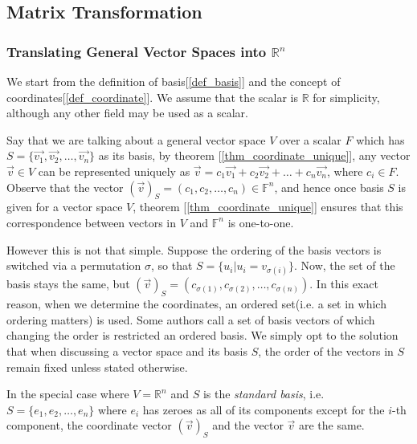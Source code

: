 \documentclass{report}
\begin{document}
	\subsection{Matrix Transformation}
	\subsubsection{Translating General Vector Spaces into $\mathbb{R}^n$}
	We start from the definition of basis[\ref{def_basis}] and the concept of coordinates[\ref{def_coordinate}]. We assume that the scalar is $\mathbb{R}$ for simplicity, although any other field may be used as a scalar.
	
	Say that we are talking about a general vector space $V$ over a scalar $F$ which has $S=\{\vec{v_1},\vec{v_2},\dots,\vec{v_n}\}$ as its basis, by theorem [\ref{thm_coordinate_unique}], any vector $\vec{v}\in V$ can be represented uniquely as $\vec{v}=c_1\vec{v_1}+c_2\vec{v_2}+\dots+c_n\vec{v_n}$, where $c_i \in F$. Observe that the vector $(\vec{v})_S=(c_1,c_2,\dots,c_n) \in \mathbb{F}^n$, and hence once basis $S$ is given for a vector space $V$, theorem [\ref{thm_coordinate_unique}] ensures that this correspondence between vectors in $V$ and $\mathbb{F}^n$ is one-to-one.
	
	However this is not that simple. Suppose the ordering of the basis vectors is switched via a permutation $\sigma$, so that $S=\{u_i|u_i=v_{\sigma(i)}\}$. Now, the set of the basis stays the same, but $(\vec{v})_S=(c_{\sigma(1)},c_{\sigma(2)},\dots,c_{\sigma(n)})$. In this exact reason, when we determine the coordinates, an ordered set(i.e. a set in which ordering matters) is used. Some authors call a set of basis vectors of which changing the order is restricted an ordered basis. We simply opt to the solution that when discussing a vector space and its basis $S$, the order of the vectors in $S$ remain fixed unless stated otherwise.
	
	In the special case where $V=\mathbb{R}^n$ and $S$ is the \emph{standard basis}, i.e. $S=\{e_1,e_2,\dots,e_n\}$ where $e_i$ has zeroes as all of its components except for the $i$-th component, the coordinate vector $(\vec{v})_S$ and the vector $\vec{v}$ are the same.
	
\end{document}
